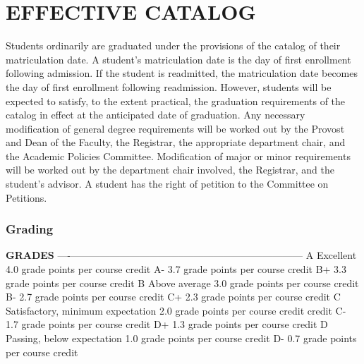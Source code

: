 \documentclass[
  letterpaper,
]{scrbook}
\renewcommand{\part}[1]{\addcontentsline{toc}{part}{#1}}
\begin{document}
\part{COLLEGE REGULATIONS}

\hypertarget{effective-catalog}{%
\chapter{EFFECTIVE CATALOG}\label{effective-catalog}}

Students ordinarily are graduated under the provisions of the catalog of
their matriculation date. A student's matriculation date is the day of
first enrollment following admission. If the student is readmitted, the
matriculation date becomes the day of first enrollment following
readmission. However, students will be expected to satisfy, to the
extent practical, the graduation requirements of the catalog in effect
at the anticipated date of graduation. Any necessary modification of
general degree requirements will be worked out by the Provost and Dean
of the Faculty, the Registrar, the appropriate department chair, and the
Academic Policies Committee. Modification of major or minor requirements
will be worked out by the department chair involved, the Registrar, and
the student's advisor. A student has the right of petition to the
Committee on Petitions.

\hypertarget{grading}{%
\subsection{Grading}\label{grading}}

\textbf{GRADES} \textbar{} \textbar{} \textbar{} \textbar{}
\textbar----\textbar-----------------------------------\textbar------------------------------------\textbar{}
\textbar{} A \textbar{} Excellent \textbar{} 4.0 grade points per course
credit \textbar{} \textbar{} A- \textbar{} \textbar{} 3.7 grade points
per course credit \textbar{} \textbar{} B+ \textbar{} \textbar{} 3.3
grade points per course credit \textbar{} \textbar{} B \textbar{} Above
average \textbar{} 3.0 grade points per course credit \textbar{}
\textbar{} B- \textbar{} \textbar{} 2.7 grade points per course credit
\textbar{} \textbar{} C+ \textbar{} \textbar{} 2.3 grade points per
course credit \textbar{} \textbar{} C \textbar{} Satisfactory, minimum
expectation \textbar{} 2.0 grade points per course credit \textbar{}
\textbar{} \textbar{} credit \textbar{} \textbar{} \textbar{} C-
\textbar{} \textbar{} 1.7 grade points per course credit \textbar{}
\textbar{} D+ \textbar{} \textbar{} 1.3 grade points per course credit
\textbar{} \textbar{} D \textbar{} Passing, below expectation \textbar{}
1.0 grade points per course credit \textbar{} \textbar{} D- \textbar{}
\textbar{} 0.7 grade points per course credit \textbar{}
\end{document}
